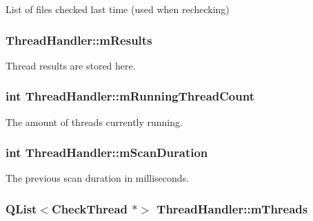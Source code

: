 List of files checked last time (used when rechecking) 

\hypertarget{class_thread_handler_a7becea262a4b51e1eca239917b644f2b}{
\subsubsection[{m\-Results}]{ Thread\-Handler\-::m\-Results\hspace{0.3cm}{\ttfamily [protected]}}}\label{class_thread_handler_a7becea262a4b51e1eca239917b644f2b}


Thread results are stored here. 

\hypertarget{class_thread_handler_ab624bd264640ef116ea802e9c41fbcc2}{
\subsubsection[{m\-Running\-Thread\-Count}]{\setlength{\rightskip}{0pt plus 5cm}int Thread\-Handler\-::m\-Running\-Thread\-Count\hspace{0.3cm}{\ttfamily [protected]}}}\label{class_thread_handler_ab624bd264640ef116ea802e9c41fbcc2}


The amount of threads currently running. 

\hypertarget{class_thread_handler_a4a815d770eadf0ba47669af57fb8d8b0}{
\subsubsection[{m\-Scan\-Duration}]{\setlength{\rightskip}{0pt plus 5cm}int Thread\-Handler\-::m\-Scan\-Duration\hspace{0.3cm}{\ttfamily [protected]}}}\label{class_thread_handler_a4a815d770eadf0ba47669af57fb8d8b0}


The previous scan duration in milliseconds. 

\hypertarget{class_thread_handler_af4d3e7352cb349e673b334a565964e2a}{
\subsubsection[{m\-Threads}]{\setlength{\rightskip}{0pt plus 5cm}Q\-List$<${\bf Check\-Thread} $\ast$$>$ Thread\-Handler\-::m\-Threads\hspace{0.3cm}{\ttfamily [protected]}}}\label{class_thread_handler_af4d3e7352cb349e673b334a565964e2a}


